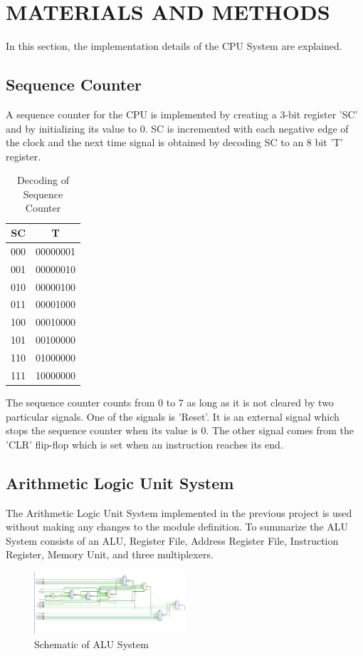 \documentclass[pdftex,12pt,a4paper]{article}
\begin{document}
\section{MATERIALS AND METHODS}
In this section, the implementation details of the CPU System are
explained.

\subsection{Sequence Counter}
A sequence counter for the CPU is implemented by creating a 3-bit
register 'SC' and by initializing its value to 0. SC is incremented
with each negative edge of the clock and the next time signal is
obtained by decoding SC to an 8 bit 'T' register.

\begin{table}[H]
\centering
\begin{tabular}{|c|c|}
  \hline
  SC & T\\
  \hline
  000 & 00000001\\
  \hline
  001 & 00000010\\
  \hline
  010 & 00000100\\
  \hline
  011 & 00001000\\
  \hline
  100 & 00010000\\
  \hline
  101 & 00100000\\
  \hline
  110 & 01000000\\
  \hline
  111 & 10000000\\
  \hline
\end{tabular}
\caption{Decoding of Sequence Counter\cite{ref1}}
\end{table}

The sequence counter counts from 0 to 7 as long as it is not cleared
by two particular signals. One of the signals is 'Reset'. It is an
external signal which stops the sequence counter when its value is
0. The other signal comes from the 'CLR' flip-flop which is set when
an instruction reaches its end.

\subsection{Arithmetic Logic Unit System}
The Arithmetic Logic Unit System implemented in the previous project is
used without making any changes to the module definition. To summarize
the ALU System consists of an ALU, Register File, Address Register
File, Instruction Register, Memory Unit, and three multiplexers.

\begin{figure}[H]
	\centering
	\includegraphics[width=0.5\textwidth]{1.png}	
	\caption{Schematic of ALU System\cite{ref1}}
	\label{fig1}
\end{figure}
\end{document}
